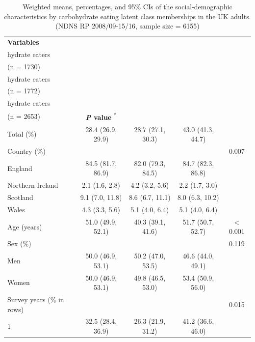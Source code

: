 \begin{table}[H]

\caption{\label{tab:Level2tab1}Weighted means, percentages, and
95\% CIs of the social-demographic characteristics by carbohydrate eating latent class memberships in the UK
adults. \\ (NDNS RP 2008/09-15/16, sample size = 6155)} \centering
\fontsize{9}{11}\selectfont

\begin{tabular}[t]{lcccc}
	\hiderowcolors
	\toprule
	\textbf{Variables} & \textbf{\Centerstack{Low carbo-\\hydrate eaters\\(n = 1730)}} & \textbf{\Centerstack{Moderate carbo-\\hydrate eaters\\(n = 1772)}} & \textbf{\Centerstack{High carbo-\\hydrate eaters\\(n = 2653)}} & \textbf{\textit{P} value} \textsuperscript{*}\\
	\midrule
	\showrowcolors
	Total (\%) & 28.4 (26.9, 29.9) & 28.7 (27.1, 30.3) & 43.0 (41.3, 44.7) & \\
	Country (\%) &  &  &  & 0.007\\
	\hspace{1em}England & 84.5 (81.7, 86.9) & 82.0 (79.3, 84.5) & 84.7 (82.3, 86.8) & \\
	\hspace{1em}Northern Ireland & 2.1 (1.6, 2.8) & 4.2 (3.2, 5.6) & 2.2 (1.7, 3.0) & \\
	\hspace{1em}Scotland & 9.1 (7.0, 11.8) & 8.6 (6.7, 11.1) & 8.0 (6.3, 10.2) & \\
	\hspace{1em}Wales & 4.3 (3.3, 5.6) & 5.1 (4.0, 6.4) & 5.1 (4.0, 6.4) & \\
	Age (years) & 51.0 (49.9, 52.1) & 40.3 (39.1, 41.6) & 51.7 (50.7, 52.7) & < 0.001\\
	Sex (\%) &  &  &  & 0.119\\
	\hspace{1em}Men & 50.0 (46.9, 53.1) & 50.2 (47.0, 53.5) & 46.6 (44.0, 49.1) & \\
	\hspace{1em}Women & 50.0 (46.9, 53.1) & 49.8 (46.5, 53.0) & 53.4 (50.9, 56.0) & \\
	Survey years (\% in rows) &  &  &  & 0.015\\
	\hspace{1em}1 & 32.5 (28.4, 36.9) & 26.3 (21.9, 31.2) & 41.2 (36.6, 46.0) & \\

\end{tabular}
\end{table}
